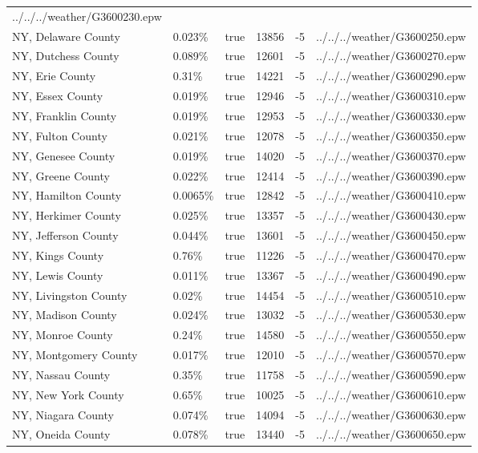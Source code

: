 \begin{longtable}[]{@{}llllll@{}}
../../../weather/G3600230.epw \\
NY, Delaware County & 0.023\% & true & 13856 & -5 &
../../../weather/G3600250.epw \\
NY, Dutchess County & 0.089\% & true & 12601 & -5 &
../../../weather/G3600270.epw \\
NY, Erie County & 0.31\% & true & 14221 & -5 &
../../../weather/G3600290.epw \\
NY, Essex County & 0.019\% & true & 12946 & -5 &
../../../weather/G3600310.epw \\
NY, Franklin County & 0.019\% & true & 12953 & -5 &
../../../weather/G3600330.epw \\
NY, Fulton County & 0.021\% & true & 12078 & -5 &
../../../weather/G3600350.epw \\
NY, Genesee County & 0.019\% & true & 14020 & -5 &
../../../weather/G3600370.epw \\
NY, Greene County & 0.022\% & true & 12414 & -5 &
../../../weather/G3600390.epw \\
NY, Hamilton County & 0.0065\% & true & 12842 & -5 &
../../../weather/G3600410.epw \\
NY, Herkimer County & 0.025\% & true & 13357 & -5 &
../../../weather/G3600430.epw \\
NY, Jefferson County & 0.044\% & true & 13601 & -5 &
../../../weather/G3600450.epw \\
NY, Kings County & 0.76\% & true & 11226 & -5 &
../../../weather/G3600470.epw \\
NY, Lewis County & 0.011\% & true & 13367 & -5 &
../../../weather/G3600490.epw \\
NY, Livingston County & 0.02\% & true & 14454 & -5 &
../../../weather/G3600510.epw \\
NY, Madison County & 0.024\% & true & 13032 & -5 &
../../../weather/G3600530.epw \\
NY, Monroe County & 0.24\% & true & 14580 & -5 &
../../../weather/G3600550.epw \\
NY, Montgomery County & 0.017\% & true & 12010 & -5 &
../../../weather/G3600570.epw \\
NY, Nassau County & 0.35\% & true & 11758 & -5 &
../../../weather/G3600590.epw \\
NY, New York County & 0.65\% & true & 10025 & -5 &
../../../weather/G3600610.epw \\
NY, Niagara County & 0.074\% & true & 14094 & -5 &
../../../weather/G3600630.epw \\
NY, Oneida County & 0.078\% & true & 13440 & -5 &
../../../weather/G3600650.epw \\

\end{longtable}
